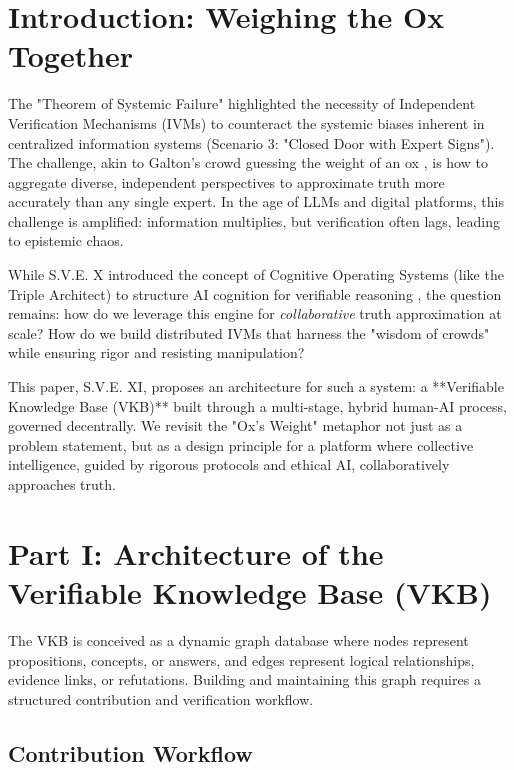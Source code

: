 \documentclass[11pt,a4paper]{article}
\theoremstyle{definition}
\theoremstyle{remark}
\begin{document}
\section{Introduction: Weighing the Ox Together}

The "Theorem of Systemic Failure" \cite[S.V.E. I]{} highlighted the necessity of Independent Verification Mechanisms (IVMs) to counteract the systemic biases inherent in centralized information systems (Scenario 3: "Closed Door with Expert Signs"). The challenge, akin to Galton's crowd guessing the weight of an ox \cite{galton1907vox}, is how to aggregate diverse, independent perspectives to approximate truth more accurately than any single expert. In the age of LLMs and digital platforms, this challenge is amplified: information multiplies, but verification often lags, leading to epistemic chaos.

While S.V.E. X introduced the concept of Cognitive Operating Systems (like the Triple Architect) to structure AI cognition for verifiable reasoning \cite[S.V.E. X]{}, the question remains: how do we leverage this engine for \textit{collaborative} truth approximation at scale? How do we build distributed IVMs that harness the "wisdom of crowds" \cite{surowiecki2004wisdom} while ensuring rigor and resisting manipulation?

This paper, S.V.E. XI, proposes an architecture for such a system: a **Verifiable Knowledge Base (VKB)** built through a multi-stage, hybrid human-AI process, governed decentrally. We revisit the "Ox's Weight" metaphor not just as a problem statement, but as a design principle for a platform where collective intelligence, guided by rigorous protocols and ethical AI, collaboratively approaches truth.

\section{Part I: Architecture of the Verifiable Knowledge Base (VKB)}

The VKB is conceived as a dynamic graph database where nodes represent propositions, concepts, or answers, and edges represent logical relationships, evidence links, or refutations. Building and maintaining this graph requires a structured contribution and verification workflow.

\subsection{Contribution Workflow}
\end{document}
